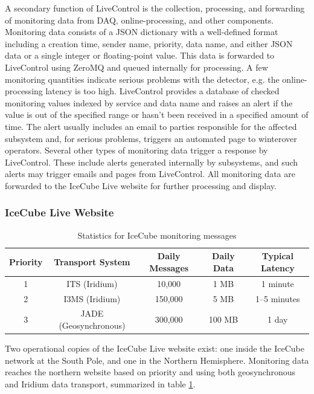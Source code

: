 A secondary function of LiveControl is the collection, processing, and forwarding of monitoring data from DAQ, online-processing, and other components.
Monitoring data consists of a JSON dictionary with a well-defined format including a creation time, sender name, priority, data name, and either JSON data
or a single integer or floating-point value.  This data is forwarded to LiveControl using ZeroMQ and queued internally for processing.  A few monitoring
quantities indicate serious problems with the detector, e.g. the online-processing latency is too high.  LiveControl provides a database of checked monitoring
values indexed by service and data name and raises an alert if the value is out of the specified range or hasn't been received in a specified amount of time.
The alert usually includes an email to parties responsible for the affected subsystem and, for serious problems, triggers an automated page to winterover operators.
Several other types of monitoring data trigger a response by LiveControl.  These include alerts generated internally by subsystems, and such alerts may trigger emails
and pages from LiveControl.  All monitoring data are forwarded to the
IceCube Live website for further processing and display.

\subsubsection{IceCube Live Website}

\begin{table}[!ht]
\begin{tabular}{|c|c|c|c|c|}
\hline
Priority & Transport System & Daily Messages & Daily Data & Typical Latency\\
\hline
1 & ITS (Iridium) & 10,000 & 1 MB & 1 minute \\
\hline
2 & I3MS (Iridium) & 150,000 & 5 MB & 1--5 minutes \\
\hline
3 & JADE (Geosynchronous) & 300,000 & 100 MB & 1 day \\
\hline
\end{tabular}
\caption{Statistics for IceCube monitoring messages}
\label{i3messages}
\end{table}

Two operational copies of the IceCube Live website exist: one inside the IceCube network at the South Pole, and
one in the Northern Hemisphere.  Monitoring data reaches the northern website based on priority and using
both geosynchronous and Iridium data transport, summarized in table \ref{i3messages}.

